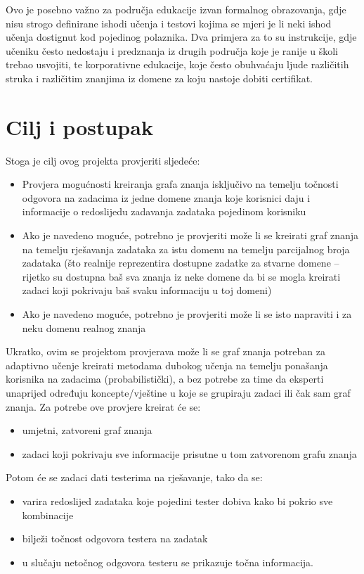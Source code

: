 \documentclass[times, utf8,projekt]{fer}
\begin{document}
Ovo je posebno važno za područja edukacije izvan formalnog obrazovanja, gdje nisu strogo definirane ishodi učenja i testovi kojima se mjeri je li neki ishod učenja dostignut kod pojedinog polaznika. Dva primjera za to su instrukcije, gdje učeniku često nedostaju i predznanja iz drugih područja koje je ranije u školi trebao usvojiti, te korporativne edukacije, koje često obuhvaćaju ljude različitih struka i različitim znanjima iz domene za koju nastoje dobiti certifikat.


\chapter{Cilj i postupak}
Stoga je cilj ovog projekta provjeriti sljedeće:
\begin{itemize}
\item Provjera mogućnosti kreiranja grafa znanja isključivo na temelju točnosti odgovora na zadacima iz jedne domene znanja koje korisnici daju i informacije o redoslijedu zadavanja zadataka pojedinom korisniku
\item Ako je navedeno moguće, potrebno je provjeriti može li se kreirati graf znanja na temelju rješavanja zadataka za istu domenu na temelju parcijalnog broja zadataka (što realnije reprezentira dostupne zadatke za stvarne domene – rijetko su dostupna baš sva znanja iz neke domene da bi se mogla kreirati zadaci koji pokrivaju baš svaku informaciju u toj domeni)
\item Ako je navedeno moguće, potrebno je provjeriti može li se isto napraviti i za neku domenu realnog znanja\newline
\end{itemize}
Ukratko, ovim se projektom provjerava može li se graf znanja potreban za adaptivno učenje kreirati metodama dubokog učenja na temelju ponašanja korisnika na zadacima (probabilistički), a bez potrebe za time da eksperti unaprijed određuju koncepte/vještine u koje se grupiraju zadaci ili čak sam graf znanja.\newline\newline
Za potrebe ove provjere kreirat će se:
\begin{itemize}
	\item umjetni, zatvoreni graf znanja 
	\item zadaci koji pokrivaju sve informacije prisutne u tom zatvorenom grafu znanja\newline
\end{itemize}
Potom će se zadaci dati testerima na rješavanje, tako da se:
\begin{itemize}
	\item varira redoslijed zadataka koje pojedini tester dobiva kako bi pokrio sve kombinacije
	\item bilježi točnost odgovora testera na zadatak
	\item u slučaju netočnog odgovora testeru se prikazuje točna informacija.
\end{itemize}
\end{document}

